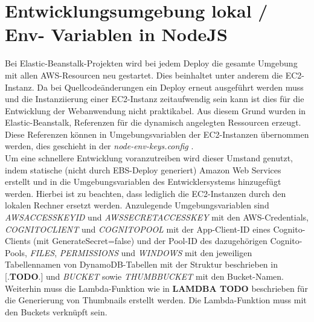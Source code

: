 \documentclass[a4paper, 12pt]{scrreprt}
\renewcommand\_{\textunderscore\allowbreak}
\begin{document}
\section{Entwicklungsumgebung lokal / Env- Variablen in NodeJS}

Bei Elastic-Beanstalk-Projekten wird bei jedem Deploy die gesamte Umgebung mit allen AWS-Resourcen neu gestartet. Dies beinhaltet unter anderem die EC2-Instanz. Da bei Quellcodeänderungen ein Deploy erneut ausgeführt werden muss und die Instanziierung einer EC2-Instanz zeitaufwendig sein kann ist dies für die Entwicklung der Webanwendung nicht praktikabel. Aus diesem Grund wurden in Elastic-Beanstalk, Referenzen \cite{AWSDc} für die dynamisch angelegten Ressourcen erzeugt. Diese Referenzen können in Umgebungsvariablen der EC2-Instanzen übernommen werden, dies geschieht in der \textit{node-env-keys.config} \cite{AWSDd}.\\
Um eine schnellere Entwicklung voranzutreiben wird dieser Umstand genutzt, indem statische (nicht durch EBS-Deploy generiert) Amazon Web Services erstellt und in die Umgebungsvariablen des Entwicklersystems hinzugefügt werden.
Hierbei ist zu beachten, dass lediglich die EC2-Instanzen durch den lokalen Rechner ersetzt werden. Anzulegende Umgebungsvariablen sind
\textit{AWS\_ACCESS\_KEY\_ID} und \textit{AWS\_SECRET\_ACCESS\_KEY} mit den AWS-Credentials, \textit{COGNITO\_CLIENT} und \textit{COGNITO\_POOL} mit der App-Client-ID eines Cognito-Clients (mit GenerateSecret=false) und der Pool-ID des dazugehörigen Cognito-Pools, \textit{FILES}, \textit{PERMISSIONS} und \textit{WINDOWS} mit den jeweiligen Tabellennamen von DynamoDB-Tabellen mit der Struktur beschrieben in [.\textbf{TODO}.] und \textit{BUCKET} sowie \textit{THUMB\_BUCKET} mit den Bucket-Namen. Weiterhin muss die Lambda-Funktion wie in \textbf{LAMDBA TODO} beschrieben  für die Generierung von Thumbnails erstellt werden. Die Lambda-Funktion muss mit den Buckets verknüpft sein.  



\end{document}
